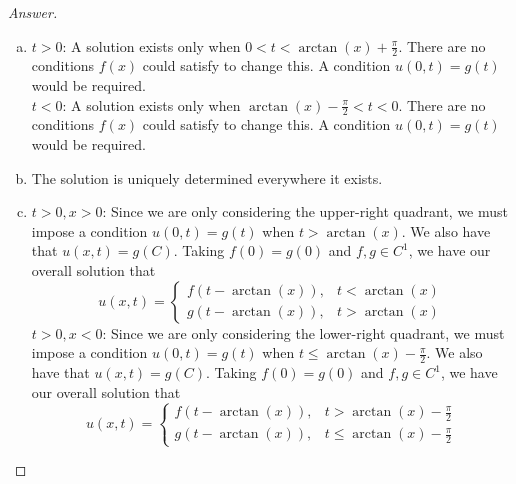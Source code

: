 \documentclass{article}
\theoremstyle{definition}
\renewcommand\qedsymbol{$\blacksquare$}
\newenvironment{ans}{\begin{proof}[Answer]\renewcommand{\qedsymbol}{}}{\end{proof}}
\begin{document}
\begin{ans}
\begin{enumerate}[(1), series=answers]
\begin{enumerate}[a)]
\begin{center}
                    \end{center}
                    
                    \item \underline{$t > 0$}: A solution exists only when $0 < t < \arctan(x) + \frac{\pi}{2}$. There are no conditions $f(x)$ could satisfy to change this. A condition $u(0,t) = g(t)$ would be required.\\
                    \underline{$t < 0$}: A solution exists only when $\arctan(x) - \frac{\pi}{2} < t < 0$. There are no conditions $f(x)$ could satisfy to change this. A condition $u(0,t) = g(t)$ would be required.

                    \item The solution is uniquely determined everywhere it exists.

                    \item \underline{$t > 0, x > 0$}: Since we are only considering the upper-right quadrant, we must impose a condition $u(0,t) = g(t)$ when $t > \arctan(x)$. We also have that $u(x,t) = g(C)$. Taking $f(0) = g(0)$ and $f,g\in C^1$, we have our overall solution that
                    \begin{equation*}
                    u(x,t) =
                    \begin{cases}
                        f\left(t-\arctan(x)\right), & t < \arctan(x)\\
                        g\left(t-\arctan(x)\right), & t > \arctan(x)
                    \end{cases}
                    \end{equation*}
                    \underline{$t > 0, x < 0$}: Since we are only considering the lower-right quadrant, we must impose a condition $u(0,t) = g(t)$ when $t \leq \arctan(x) - \frac{\pi}{2}$. We also have that $u(x,t) = g(C)$. Taking $f(0) = g(0)$ and $f,g\in C^1$, we have our overall solution that
                    \begin{equation*}
                    u(x,t) =
                    \begin{cases}
                        f\left(t-\arctan(x)\right), & t > \arctan(x) - \frac{\pi}{2}\\
                        g\left(t-\arctan(x)\right), & t \leq \arctan(x) - \frac{\pi}{2}
                    \end{cases}
                    \end{equation*}


\end{enumerate}
\end{enumerate}
\end{ans}
\end{document}
